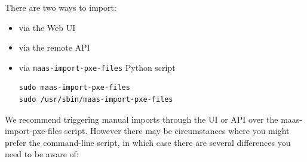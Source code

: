 There are two ways to import:
\begin{itemize}
  \item via the Web UI
  \item via the remote API
  \item via \verb!maas-import-pxe-files! Python script 
  
\begin{verbatim}
sudo maas-import-pxe-files
sudo /usr/sbin/maas-import-pxe-files
\end{verbatim}
\end{itemize}
We recommend triggering manual imports through the UI or API over the
maas-import-pxe-files script. However there may be circumstances where you might
prefer the command-line script, in which case there are several differences you
need to be aware of: 


